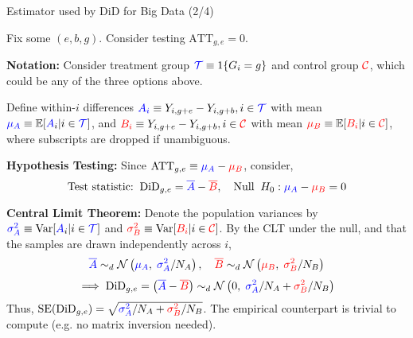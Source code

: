 \documentclass[usenames,dvipsnames]{beamer}
\begin{document}
\begin{frame}{Estimator used by DiD for Big Data (2/4)}

Fix some $(e,b,g)$. Consider testing $\text{ATT}_{g,e} =0$.

\textbf{Notation:} Consider treatment group ${\color{blue}\mathcal{T}} \equiv 1\{G_i =g\}$ and control group ${\color{red}\mathcal{C}}$, which could be any of the three options above.  

Define within-$i$ differences ${\color{blue}A_{i}} \equiv Y_{i,g+e} - Y_{i,g+b}, i\in{\color{blue}\mathcal{T}}$ with mean ${\color{blue}\mu_A}\equiv \mathbb{E}[{\color{blue}A}_{i} | i \in {\color{blue}\mathcal{T}} ]$, and ${\color{red}B_{i}} \equiv Y_{i,g+e} - Y_{i,g+b}, i\in{\color{red}\mathcal{C}}$ with mean ${\color{red}\mu_B} \equiv \mathbb{E}[{\color{red}B_i} |  i\in{\color{red}\mathcal{C}}]$, where subscripts are dropped if unambiguous.

\textbf{Hypothesis Testing:}  Since $\text{ATT}_{g,e} \equiv {\color{blue}\mu_A} - {\color{red}\mu_B}$, consider,
\vspace{-0.03cm}
\begin{equation} \notag
\text{Test statistic:} \;\; \text{DiD}_{g,e} = {\color{blue}\overline{A}} - {\color{red}\overline{B}} , \quad \text{Null} \;\; H_0:   {\color{blue}\mu_A} - {\color{red}\mu_B} = 0
\end{equation}


\vspace{-0.12cm}

\textbf{Central Limit Theorem:} Denote the population variances by ${\color{blue}\sigma^2_A}\equiv \text{Var}[{\color{blue}A}_{i} | i \in {\color{blue}\mathcal{T}} ]$ and ${\color{red}\sigma^2_B} \equiv \text{Var}[{\color{red}B_i} |  i\in{\color{red}\mathcal{C}}]$. By the CLT under the null, and that the samples are drawn independently across $i$,  
\vspace{-0.03cm}
\begin{equation} \notag
 {\color{blue}\overline{A}} \sim_d \mathcal{N}\left( {\color{blue}\mu_A} , \; {\color{blue}\sigma^2_A}/N_A \right), \quad  {\color{red}\overline{B}} \sim_d \mathcal{N}\left( {\color{red}\mu_B} , \; {\color{red}\sigma^2_B}/N_B \right) 
\end{equation}
\begin{equation} \notag
\implies  \text{DiD}_{g,e} = \left(  {\color{blue}\overline{A}} - {\color{red}\overline{B}} \right) \sim_d  \mathcal{N}\left( 0 , \;  {\color{blue}\sigma^2_A}/N_A  + {\color{red}\sigma^2_B}/N_B   \right)
\end{equation}
Thus,  $\text{SE}(\text{DiD}_{g,e}) = \sqrt{{\color{blue}\sigma^2_A}/N_A  + {\color{red}\sigma^2_B}/N_B  }$. The empirical counterpart is trivial to compute (e.g. no matrix inversion needed).

 
\end{frame}
\end{document}
